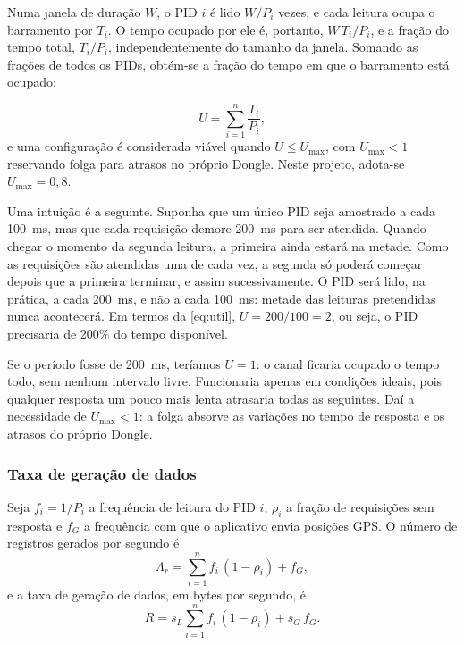 \documentclass[12pt]{article}
\begin{document}
Numa janela de duração $W$, o PID $i$ é lido $W/P_i$ vezes, e cada leitura ocupa o barramento por $T_i$. O tempo ocupado por ele é, portanto, $W\,T_i/P_i$, e a fração do tempo total, $T_i/P_i$, independentemente do tamanho da janela. Somando as frações de todos os PIDs, obtém-se a fração do tempo em que o barramento está ocupado:

\begin{equation}
  U = \sum_{i=1}^{n} \frac{T_i}{P_i},
  \label{eq:util}
\end{equation}
e uma configuração é considerada viável quando $U \le U_{\max}$, com $U_{\max} < 1$ reservando folga para atrasos no próprio Dongle. Neste projeto, adota-se $U_{\max} = 0{,}8$.

Uma intuição é a seguinte. Suponha que um único PID seja amostrado a cada \SI{100}{\milli\second}, mas que cada requisição demore \SI{200}{\milli\second} para ser atendida. Quando chegar o momento da segunda leitura, a primeira ainda estará na metade. Como as requisições são atendidas uma de cada vez, a segunda só poderá começar depois que a primeira terminar, e assim sucessivamente. O PID será lido, na prática, a cada \SI{200}{\milli\second}, e não a cada \SI{100}{\milli\second}: metade das leituras pretendidas nunca acontecerá. Em termos da \autoref{eq:util}, $U = 200/100 = 2$, ou seja, o PID precisaria de 200\% do tempo disponível.

Se o período fosse de \SI{200}{\milli\second}, teríamos $U = 1$: o canal ficaria ocupado o tempo todo, sem nenhum intervalo livre. Funcionaria apenas em condições ideais, pois qualquer resposta um pouco mais lenta atrasaria todas as seguintes. Daí a necessidade de $U_{\max} < 1$: a folga absorve as variações no tempo de resposta e os atrasos do próprio Dongle.

\subsubsection{Taxa de geração de dados}


Seja $f_i = 1/P_i$ a frequência de leitura do PID $i$, $\rho_i$ a fração de requisições sem resposta e $f_G$ a frequência com que o aplicativo envia posições GPS. O número de registros gerados por segundo é
\begin{equation}
  \Lambda_r = \sum_{i=1}^{n} f_i\,(1 - \rho_i) + f_G ,
  \label{eq:registros}
\end{equation}
e a taxa de geração de dados, em bytes por segundo, é
\begin{equation}
  R = s_L \sum_{i=1}^{n} f_i\,(1 - \rho_i) + s_G\,f_G .
  \label{eq:taxa}
\end{equation}
\end{document}
